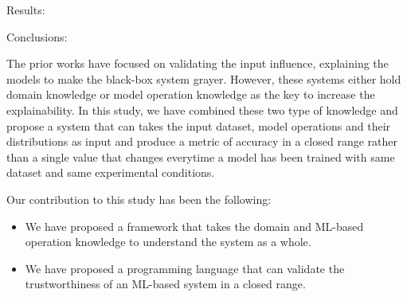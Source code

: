 Results: 

Conclusions: 






The prior works have focused on validating the input influence, explaining the models to make the black-box system grayer. However, these systems either hold domain knowledge or model operation knowledge as the key to increase the explainability. In this study, we have combined these two type of knowledge and propose a system that can takes the input dataset, model operations and their distributions as input and produce a metric of accuracy in a closed range rather than a single value that changes everytime a model has been trained with same dataset and same experimental conditions.

Our contribution to this study has been the following:
\begin{itemize}
	\item We have proposed a framework that takes the domain and ML-based operation knowledge to understand the system as a whole.
	\item We have proposed a programming language that can validate the trustworthiness of an ML-based system in a closed range.
\end{itemize}
